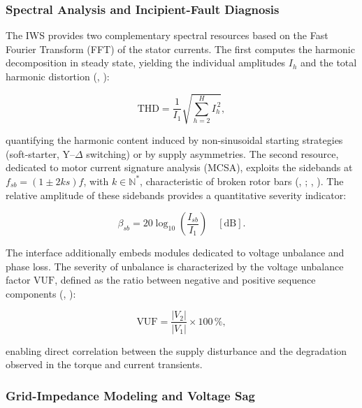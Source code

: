 \documentclass[a4paper]{ifacconf}
\begin{document}
\subsubsection{Spectral Analysis and Incipient-Fault Diagnosis}

The IWS provides two complementary spectral resources based on the Fast Fourier Transform (FFT) of the stator currents. The first computes the harmonic decomposition in steady state, yielding the individual amplitudes $I_h$ and the total harmonic distortion (\citeauthor{mohapatra2019steady}, \citeyear{mohapatra2019steady}):

\begin{equation}
\label{eq:thd_en}
\text{THD} = \frac{1}{I_1}\sqrt{\sum_{h=2}^{H} I_h^{\,2}},
\end{equation}

\noindent quantifying the harmonic content induced by non-sinusoidal starting strategies (soft-starter, Y--$\Delta$ switching) or by supply asymmetries. The second resource, dedicated to motor current signature analysis (MCSA), exploits the sidebands at $f_{sb} = (1 \pm 2ks)f$, with $k \in \mathbb{N}^{*}$, characteristic of broken rotor bars (\citeauthor{arkan2005modelling}, \citeyear{arkan2005modelling}; \citeauthor{tuanmohamad2024advance}, \citeyear{tuanmohamad2024advance}). The relative amplitude of these sidebands provides a quantitative severity indicator:

\begin{equation}
\label{eq:mcsa_severity_en}
\beta_{sb} = 20\log_{10}\!\left(\frac{I_{sb}}{I_1}\right) \quad [\mathrm{dB}].
\end{equation}

The interface additionally embeds modules dedicated to voltage unbalance and phase loss. The severity of unbalance is characterized by the voltage unbalance factor $\text{VUF}$, defined as the ratio between negative and positive sequence components (\citeauthor{karakas2009aggregation}, \citeyear{karakas2009aggregation}):

\begin{equation}
\label{eq:vuf_en}
\text{VUF} = \frac{|V_2|}{|V_1|} \times 100\,\%,
\end{equation}

\noindent enabling direct correlation between the supply disturbance and the degradation observed in the torque and current transients.

\subsubsection{Grid-Impedance Modeling and Voltage Sag}
\end{document}
